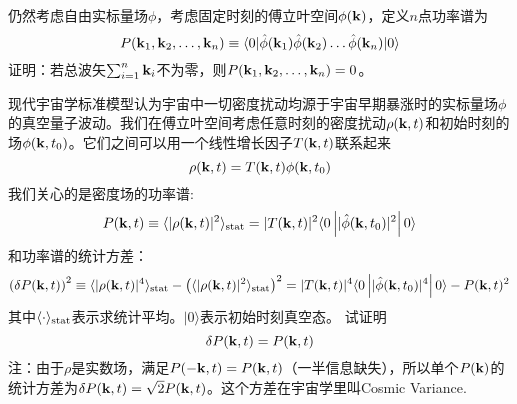 \documentclass[CJK]{beamer}
\begin{document}
\begin{frame}
\bch
仍然考虑自由实标量场$\phi$，考虑固定时刻的傅立叶空间$\phi({\mathbf{k}})$，定义$n$点功率谱为
$$P({\mathbf{k}}_1,{\mathbf{k}}_2,\ldots,{\mathbf{k}}_n) \equiv \langle 0 | {\hat{\phi}}({\mathbf{k}}_1){\hat{\phi}}({\mathbf{k}}_2)\ldots{\hat{\phi}}({\mathbf{k}}_n)|0\rangle$$
证明：若总波矢$\sum_{i=1}^n{\mathbf{k}}_i$不为零，则$P({\mathbf{k}}_1,{\mathbf{k}}_2,\ldots,{\mathbf{k}}_n) = 0$。
\ech
\end{frame}


\begin{frame}
\bch
{\small
现代宇宙学标准模型认为宇宙中一切密度扰动均源于宇宙早期暴涨时的实标量场$\phi$的真空量子波动。我们在傅立叶空间考虑任意时刻的密度扰动$\rho({\mathbf{k}}, t)$和初始时刻的场$\phi({\mathbf{k}}, t_0)$。它们之间可以用一个线性增长因子$T({\mathbf{k}},t)$联系起来
$$\rho ({\mathbf{k}}, t) = T({\mathbf{k}}, t) \phi({\mathbf{k}}, t_0)$$
我们关心的是密度场的功率谱:
$$P({\mathbf{k}},t)\equiv \langle |\rho ({\mathbf{k}}, t)|^2\rangle_{\rm stat} = |T({\mathbf{k}}, t)|^2\langle 0\left\vert |{\hat{\phi}}({\mathbf{k}}, t_0)|^2 \right\vert 0 \rangle$$
和功率谱的统计方差：{\scriptsize
$$ \left(\delta P({\mathbf{k}},t)\right)^2 \equiv \langle |\rho ({\mathbf{k}}, t)|^4 \rangle_{\rm stat} - \left(\langle |\rho ({\mathbf{k}}, t)|^2 \rangle_{\rm stat} \right)^ 2 = |T({\mathbf{k}}, t)|^4\langle 0\left\vert |{\hat{\phi}}({\mathbf{k}}, t_0)|^4 \right\vert 0 \rangle - P({\mathbf{k}},t)^2 $$ }
其中$\langle \cdot \rangle_{\rm stat}$表示求统计平均。$|0\rangle$表示初始时刻真空态。
试证明$$\delta P({\mathbf{k}},t) = P({\mathbf{k}},t)$$
{\scriptsize 注：由于$\rho$是实数场，满足$P(-{\mathbf{k}},t) = P({\mathbf{k}},t)$（一半信息缺失），所以单个$P({\mathbf{k}})$的统计方差为$\delta P({\mathbf{k}},t) = \sqrt{2}P({\mathbf{k}},t)$。这个方差在宇宙学里叫Cosmic Variance.}
}

\ech
\end{frame}
\end{document}
